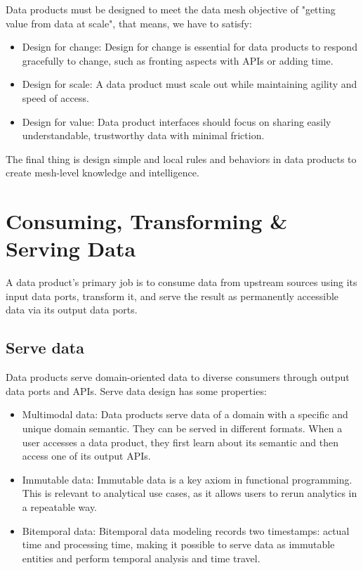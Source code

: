 \documentclass[12pt, a4paper]{book}
\begin{document}
Data products must be designed to meet the data mesh objective of "getting value from data at scale", that means, we have to satisfy:
	\begin{itemize}[nosep]
		\item Design for change: Design for change is essential for data products to respond gracefully to change, such as fronting aspects with APIs or adding time.
		\item Design for scale: A data product must scale out while maintaining agility and speed of access.
		\item Design for value: Data product interfaces should focus on sharing easily understandable, trustworthy data with minimal friction.
	\end{itemize}

The final thing is design simple and local rules and behaviors in data products to create mesh-level knowledge and intelligence.

\section{Consuming, Transforming \& Serving Data}
A data product’s primary job is to consume data from upstream sources using its input data ports, transform it, and serve the result as permanently accessible data via its output data ports.

\subsection{Serve data}
Data products serve domain-oriented data to diverse consumers through output data ports and APIs. Serve data design has some properties:
	\begin{itemize}[nosep]
		\item Multimodal data: Data products serve data of a domain with a specific and unique domain semantic. They can be served in different formats. When a user accesses a data product, they first learn about its semantic and then access one of its output APIs.
		\item Immutable data: Immutable data is a key axiom in functional programming. This is relevant to analytical use cases, as it allows users to rerun analytics in a repeatable way.
		\item Bitemporal data: Bitemporal data modeling records two timestamps: actual time and processing time, making it possible to serve data as immutable entities and perform temporal analysis and time travel.
	\end{itemize}
\end{document}
